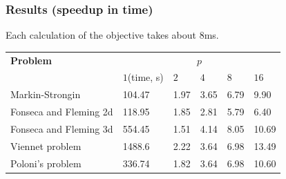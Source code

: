 \documentclass[aspectratio=1610]{beamer}
\begin{document}
%
%
\begin{frame}
  \frametitle{Results (speedup in time)}
  Each calculation of the objective takes about 8ms.
  \begin{table}[ht]
    \centering
    \begin{tabular}{|l|p{1.6cm}|p{1.5cm}|p{1.5cm}|p{1.5cm}|p{1.5cm}|}
  \hline
  \textbf{Problem} & \multicolumn{5}{c|}{\(p\)}\\
  \cline{2-6}
  &\(1\)(time, s) & \(2\) & \(4\) & \(8\) & \(16\)\\
  \hline
  Markin-Strongin & 104.47 & 1.97 & 3.65 & 6.79 & 9.90 \\
  \hline
  Fonseca and Fleming 2d & 118.95 & 1.85 & 2.81 & 5.79 & 6.40 \\
  \hline
  Fonseca and Fleming 3d & 554.45 & 1.51 & 4.14 & 8.05 & 10.69 \\
  \hline
  Viennet problem & 1488.6 & 2.22 & 3.64 & 6.98 & 13.49\\
  \hline
  Poloni's problem & 336.74 & 1.82 & 3.64 & 6.98 & 10.60 \\
  \hline
  \end{tabular}
  \end{table}
\end{frame}
\end{document}
